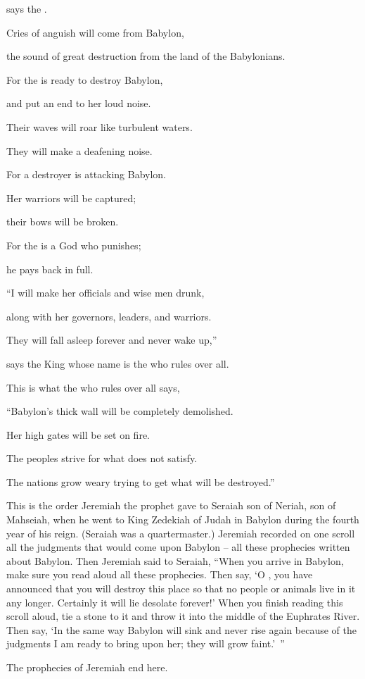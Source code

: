 {\par }{\Q says
the {}.
\par }{\Q {}Cries
of anguish
will come from Babylon,
\par }{\Q the sound of great
destruction
from the land
of the Babylonians.
\par }{\Q {}For
the {}
is ready to destroy
Babylon,
\par }{\Q and put an end
to her loud
noise.
\par }{\Q Their waves
will roar
like turbulent
waters.
\par }{\Q They will make
a deafening
noise.
\par }{\Q {}For
a destroyer
is attacking
Babylon.
\par }{\Q Her warriors
will be captured;
\par }{\Q their bows
will be broken.
\par }{\Q For
the {}
is a God
who punishes;
\par }{\Q he pays back in full.
\par }{\Q {}“I will make her officials
and wise
men drunk,
\par }{\Q along with her governors,
leaders,
and warriors.
\par }{\Q They will fall asleep
forever
and never
wake
up,”

\par }{\Q says
the King
whose name
is the
{}
who rules over all.
\par }{\Q {}This is what the
{}
who rules over all
says,
\par }{\Q “Babylon’s
thick
wall
will be completely demolished.
\par }{\Q Her high
gates
will be set on fire.
\par }{\Q The peoples
strive
for what does not satisfy.
\par }{\Q The nations
grow weary
trying
to get what will be destroyed.”
\par }{\PP {}This is the order
Jeremiah
the prophet
gave to Seraiah
son
of Neriah,
son
of Mahseiah,
when he went
to
King
Zedekiah
of Judah
in Babylon
during the fourth
year
of his reign.
(Seraiah
was a quartermaster.)
Jeremiah
recorded
on one
scroll
all
the judgments
that
would
come
upon
Babylon
– all
these
prophecies
written
about
Babylon.
Then Jeremiah
said
to
Seraiah,
“When you arrive
in Babylon,
make sure
you read
aloud all
these
prophecies.
Then say,
‘O
{}, you
have announced
that you will destroy
this
place
so that no
people
or animals
live
in it any longer. Certainly
it will lie desolate
forever!’
When
you finish
reading
this
scroll
aloud, tie
a stone
to it and throw
it into
the middle
of the Euphrates River.
Then say,
‘In the same
way Babylon
will sink
and never
rise
again because of the judgments
I am
ready to bring
upon
her; they will grow faint.’ ”
\par }{\PP The prophecies
of Jeremiah
end
here.

}
